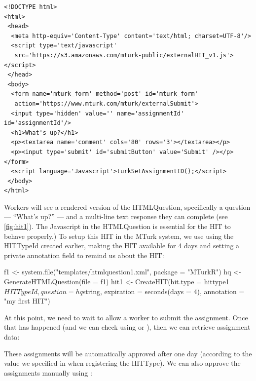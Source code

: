 \begin{verbatim}
<!DOCTYPE html>
<html>
 <head>
  <meta http-equiv='Content-Type' content='text/html; charset=UTF-8'/>
  <script type='text/javascript' 
   src='https://s3.amazonaws.com/mturk-public/externalHIT_v1.js'></script>
 </head>
 <body>
  <form name='mturk_form' method='post' id='mturk_form' 
   action='https://www.mturk.com/mturk/externalSubmit'>
  <input type='hidden' value='' name='assignmentId' id='assignmentId'/>
  <h1>What's up?</h1>
  <p><textarea name='comment' cols='80' rows='3'></textarea></p>
  <p><input type='submit' id='submitButton' value='Submit' /></p></form>
  <script language='Javascript'>turkSetAssignmentID();</script>
 </body>
</html>
\end{verbatim}

\noindent Workers will see a rendered version of the HTMLQuestion, specifically a question --- ``What's up?'' --- and a multi-line text response they can complete (see \ref{fig:hit1}). The Javascript in the HTMLQuestion is essential for the HIT to behave properly.) To setup this HIT in the MTurk system, we use  using the HITTypeId created earlier, making the HIT available for 4 days and setting a private annotation field to remind us about the HIT:

\begin{example}
f1 <- system.file("templates/htmlquestion1.xml", package = "MTurkR")
hq <- GenerateHTMLQuestion(file = f1)
hit1 <- CreateHIT(hit.type = hittype1$HITTypeId, 
                  question = hq$string,
                  expiration = seconds(days = 4),
                  annotation = "my first HIT")
\end{example}

At this point, we need to wait to allow a worker to submit the assignment. Once that has happened (and we can check using  or ), then we can retrieve assignment data:


These assignments will be automatically approved after one day (according to the value we specified in  when registering the HITType). We can also approve the assignments manually using :

